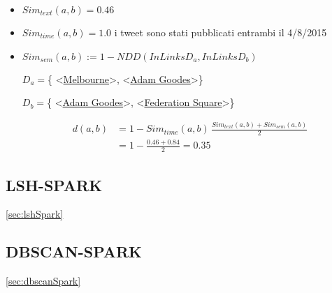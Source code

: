 \begin{itemize}
\item $Sim_{text}(a,b)=0.46$ 
\item $Sim_{time}(a,b)=1.0$ i tweet sono stati pubblicati entrambi il 4/8/2015
\item $Sim_{sem}(a,b):=1-NDD(InLinks{D_a},InLinks{D_b}) $


  $D_a=$\{ \textless\href{http://dbpedia.org/resource/Melbourne}{Melbourne}\textgreater, \textless\href{http://dbpedia.org/resource/Adam_Goodes}{Adam Goodes}\textgreater\}
  
  $D_b=$\{ \textless\href{http://dbpedia.org/resource/Adam_Goodes}{Adam Goodes}\textgreater, \textless\href{http://dbpedia.org/resource/Federation_Square}{Federation Square}\textgreater\}
 
 \begin{align*}
d(a,b)&=1- Sim_{time}(a,b)\,\frac{Sim_{text}(a,b)+Sim_{sem}(a,b)}{2}\\
&=1-\frac{0.46+0.84}{2}=0.35
\end{align*}
  
\end{itemize}

\subsection{LSH-SPARK}
\ref{sec:lshSpark}
\subsection{DBSCAN-SPARK}
\ref{sec:dbscanSpark}

